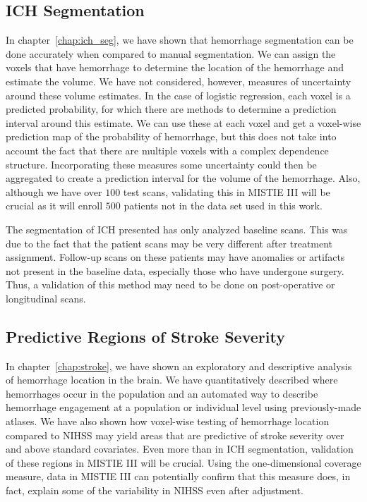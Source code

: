 \subsection{ICH Segmentation}
In chapter~\ref{chap:ich_seg}, we have shown that hemorrhage segmentation can be done accurately when compared to manual segmentation.  We can assign the voxels that have hemorrhage to determine the location of the hemorrhage and estimate the volume.  We have not considered, however, measures of uncertainty around these volume estimates.  In the case of logistic regression, each voxel is a predicted probability, for which there are methods to determine a prediction interval around this estimate.  We can use these at each voxel and get a voxel-wise prediction map of the probability of hemorrhage, but this does not take into account the fact that there are multiple voxels with a complex dependence structure.  Incorporating these measures some uncertainty could then be aggregated to create a prediction interval for the volume of the hemorrhage.  Also, although we have over $100$ test scans, validating this in MISTIE III will be crucial as it will enroll $500$ patients not in the data set used in this work. 

The segmentation of ICH presented has only analyzed baseline scans.  This was due to the fact that the patient scans may be very different after treatment assignment.  Follow-up scans on these patients may have anomalies or artifacts not present in the baseline data, especially those who have undergone surgery. Thus, a validation of this method may need to be done on post-operative or longitudinal scans.  

\subsection{Predictive Regions of Stroke Severity}
In chapter~\ref{chap:stroke}, we have shown an exploratory and descriptive analysis of hemorrhage location in the brain.  We have quantitatively described where hemorrhages occur in the population and an automated way to describe hemorrhage engagement at a population or individual level using previously-made atlases.  We have also shown how voxel-wise testing of hemorrhage location compared to NIHSS may yield areas that are predictive of stroke severity over and above standard covariates.  Even more than in ICH segmentation, validation of these regions in MISTIE III will be crucial.  Using the one-dimensional coverage measure, data in MISTIE III can potentially confirm that this measure does, in fact, explain some of the variability in NIHSS even after adjustment.  

